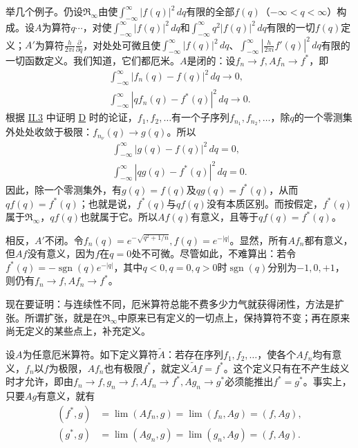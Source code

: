 \documentclass[fontsize=13pt,twoside,openany,headings=normal,parskip=false,bookmarkpackage=false,DIV=calc]{scrbook}
\begin{document}
\hypertarget{origpage-76}{}\label{origpage-76}举几个例子。仍设$\mathfrak{R}_\infty$由使$\int_{-\infty}^{\infty}|f(q)|^2\,dq$有限的全部$f(q)$（$-\infty<q<\infty$）构成。设$A$为算符$q\cdots$，对使$\int_{-\infty}^{\infty}|f(q)|^2\,dq$和$\int_{-\infty}^{\infty}q^2|f(q)|^2\,dq$有限的一切$f(q)$定义；$A'$为算符$\frac{h}{2\pi i}\frac{\partial}{\partial q}$，对处处可微且使$\int_{-\infty}^{\infty}|f(q)|^2\,dq$、$\int_{-\infty}^{\infty}|\frac{h}{2\pi i}f'(q)|^2\,dq$有限的一切函数定义。我们知道，它们都厄米。$A$是闭的：设$f_n\to f,\allowbreak Af_n\to f^*$，即
\begin{gather*}
\int_{-\infty}^{\infty}|f_n(q)-f(q)|^2\,dq\to0,\\
\int_{-\infty}^{\infty}|qf_n(q)-f^*(q)|^2\,dq\to0.
\end{gather*}
根据 \hyperref[sec:II.3]{II.3} 中证明 \hyperref[ax:II.D]{D} 时的论证，$f_1,\allowbreak f_2,\allowbreak \ldots$有一个子序列$f_{n_1},\allowbreak f_{n_2},\allowbreak \ldots$，除$q$的一个零测集外处处收敛于极限：$f_{n_\nu}(q)\to g(q)$。所以
\begin{gather*}
\int_{-\infty}^{\infty}|g(q)-f(q)|^2\,dq=0,\\
\int_{-\infty}^{\infty}|qg(q)-f^*(q)|^2\,dq=0.
\end{gather*}
因此，除一个零测集外，有$g(q)=f(q)$及$qg(q)=f^*(q)$，从而$qf(q)=f^*(q)$；也就是说，$f^*(q)$与$qf(q)$没有本质区别。而按假定，$f^*(q)$属于$\mathfrak{R}_\infty$，$qf(q)$也就属于它。所以$Af(q)$有意义，且等于$qf(q)=f^*(q)$。

相反，$A'$不闭。令$f_n(q)=e^{-\sqrt{q^2+1/n}},\allowbreak f(q)=e^{-|q|}$。显然，所有$Af_n$都有意义，但$Af$没有意义，因为$f$在$q=0$处不可微。尽管如此，不难算出：若令$f^*(q)=-\operatorname{sgn}(q)e^{-|q|}$，其中$q<0,\allowbreak q=0,\allowbreak q>0$时$\operatorname{sgn}(q)$分别为$-1,\allowbreak 0,\allowbreak +1$，则仍有$f_n\to f,\allowbreak Af_n\to f^*$。

现在要证明：与连续性不同，厄米算符总能不费多少力气就获得闭性，方法是扩张。所谓扩张，就是在$\mathfrak{R}_\infty$中原来已有定义的一切点上，保持算符不变；再在原来尚无定义的某些点上，补充定义。

设$A$为任意厄米算符。如下定义算符$\widetilde A$：若存在序列$f_1,\allowbreak f_2,\allowbreak \ldots$，使各个$Af_n$均有意义，$f_n$以$f$为极限，$Af_n$也有极限$f^*$，就定义$\widetilde Af=f^*$。这个定义只有在不产生歧义时才允许，即由$f_n\to f,\allowbreak g_n\to f,\allowbreak Af_n\to f^*,\allowbreak Ag_n\to g^*$必须能推出$f^*=g^*$。事实上，只要$Ag$有意义，就有
\begin{align*}
(f^*,g)&=\lim(Af_n,g)=\lim(f_n,Ag)=(f,Ag),\\
(g^*,g)&=\lim(Ag_n,g)=\lim(g_n,Ag)=(f,Ag).
\end{align*}
\end{document}
